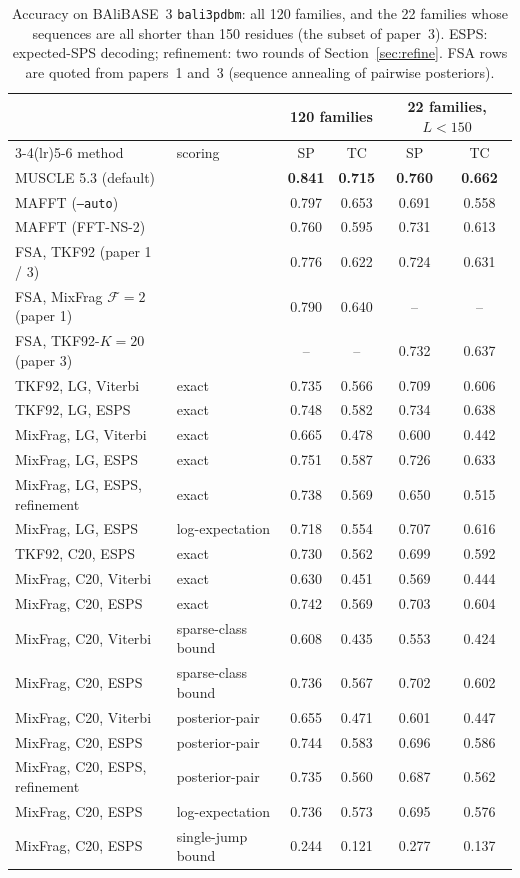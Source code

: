 \documentclass[11pt]{article}
\begin{document}
\begin{table}[t]
\centering
\footnotesize
\setlength{\tabcolsep}{4pt}
\caption{Accuracy on BAliBASE~3 \texttt{bali3pdbm}: all 120 families, and the
22 families whose sequences are all shorter than 150 residues (the subset of
paper~3). ESPS: expected-SPS decoding; refinement: two rounds of
Section~\ref{sec:refine}. FSA rows are quoted from papers~1 and~3 (sequence
annealing of pairwise posteriors).}
\label{tab:results}
\begin{tabular}{llcccc}
\toprule
& & \multicolumn{2}{c}{120 families} & \multicolumn{2}{c}{22 families, $L<150$}\\
\cmidrule(lr){3-4}\cmidrule(lr){5-6}
method & scoring & SP & TC & SP & TC\\
\midrule
MUSCLE 5.3 (default) & & \textbf{0.841} & \textbf{0.715} & \textbf{0.760} & \textbf{0.662}\\
MAFFT (\texttt{--auto}) & & 0.797 & 0.653 & 0.691 & 0.558\\
MAFFT (FFT-NS-2) & & 0.760 & 0.595 & 0.731 & 0.613\\
\midrule
FSA, TKF92 (paper 1 / 3) & & 0.776 & 0.622 & 0.724 & 0.631\\
FSA, MixFrag $\mathcal F{=}2$ (paper 1) & & 0.790 & 0.640 & -- & --\\
FSA, TKF92-$K{=}20$ (paper 3) & & -- & -- & 0.732 & 0.637\\
\midrule
TKF92, LG, Viterbi & exact & 0.735 & 0.566 & 0.709 & 0.606\\
TKF92, LG, ESPS & exact & 0.748 & 0.582 & 0.734 & 0.638\\
MixFrag, LG, Viterbi & exact & 0.665 & 0.478 & 0.600 & 0.442\\
MixFrag, LG, ESPS & exact & 0.751 & 0.587 & 0.726 & 0.633\\
MixFrag, LG, ESPS, refinement & exact & 0.738 & 0.569 & 0.650 & 0.515\\
MixFrag, LG, ESPS & log-expectation & 0.718 & 0.554 & 0.707 & 0.616\\
\midrule
TKF92, C20, ESPS & exact & 0.730 & 0.562 & 0.699 & 0.592\\
MixFrag, C20, Viterbi & exact & 0.630 & 0.451 & 0.569 & 0.444\\
MixFrag, C20, ESPS & exact & 0.742 & 0.569 & 0.703 & 0.604\\
MixFrag, C20, Viterbi & sparse-class bound & 0.608 & 0.435 & 0.553 & 0.424\\
MixFrag, C20, ESPS & sparse-class bound & 0.736 & 0.567 & 0.702 & 0.602\\
MixFrag, C20, Viterbi & posterior-pair & 0.655 & 0.471 & 0.601 & 0.447\\
MixFrag, C20, ESPS & posterior-pair & 0.744 & 0.583 & 0.696 & 0.586\\
MixFrag, C20, ESPS, refinement & posterior-pair & 0.735 & 0.560 & 0.687 & 0.562\\
MixFrag, C20, ESPS & log-expectation & 0.736 & 0.573 & 0.695 & 0.576\\
MixFrag, C20, ESPS & single-jump bound & 0.244 & 0.121 & 0.277 & 0.137\\
\bottomrule
\end{tabular}
\end{table}
\end{document}
